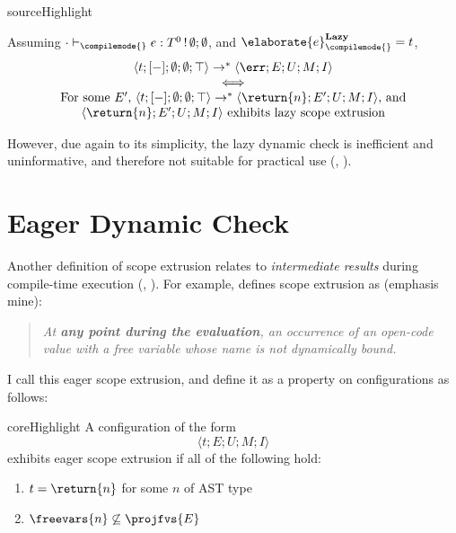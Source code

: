 \begin{theorem}{sourceHighlight}

Assuming $\cdot \vdash_{\compilemode{}} e: T^0 \, ! \, \emptyset;\emptyset$, and $\elaborate{e}_{\compilemode{}}^{\textbf{Lazy}} = t$, 
\[\begin{array}{c}
\langle t; [-]; \emptyset; \emptyset; \top \rangle \to^{*} \langle \err; E; U; M; I \rangle \\
\iff \\
\text{For some $E'$, }
\langle t; [-]; \emptyset; \emptyset; \top \rangle \to^{*} \langle \return{n}; E'; U; M; I \rangle\text{, and}\\
\langle \return{n}; E'; U; M; I \rangle \text{ exhibits lazy scope extrusion}
\end{array}
\]
\end{theorem}

However, due again to its simplicity, the lazy dynamic check is inefficient and uninformative, and therefore not suitable for practical use \citep{kiselyov-14} (, ).

\section{Eager Dynamic Check}\label{section:eager-dynamic-check-formal}
Another definition of scope extrusion relates to \textit{intermediate results} during compile-time execution (, ). For example, \citet{kiselyov-14} defines scope extrusion as (emphasis mine):

\begin{quote}
  \textit{At \textbf{any point during the evaluation}, an occurrence of an open-code value with a free variable whose name is not dynamically bound.}
\end{quote}

I call this eager scope extrusion, and define it as a property on \coreLang{} configurations as follows: 
\begin{definition}{coreHighlight} A \coreLang{} configuration of the form 
\[\langle t;E;U;M;I\rangle\]  
exhibits eager scope extrusion if all of the following hold:
  \begin{enumerate}
    \item $t = \return{n}$ for some $n$ of \textsf{AST} type
    \item $\freevars{n} \not\subseteq \projfvs{E}$
  \end{enumerate}
\end{definition}

